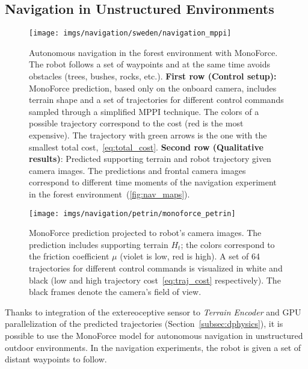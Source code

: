 \subsection{Navigation in Unstructured Environments}\label{subsec:navigation}
\begin{figure*}
    \centering
    \texttt{[image: imgs/navigation/sweden/navigation\_mppi]}
    \caption{Autonomous navigation in the forest environment with MonoForce.
    The robot follows a set of waypoints and at the same time avoids obstacles (trees, bushes, rocks, etc.).
    \textbf{First row (Control setup):}
    MonoForce prediction, based only on the onboard camera, includes terrain shape and a set of trajectories for different control commands sampled through a simplified MPPI technique.
    The colors of a possible trajectory correspond to the cost (red is the most expensive).
    The trajectory with green arrows is the one with the smallest total cost,~\eqref{eq:total_cost}.
    \textbf{Second row (Qualitative results)}: Predicted supporting terrain and robot trajectory given camera images.
    The predictions and frontal camera images correspond to different time moments of the navigation experiment in the forest environment~(\autoref{fig:nav_maps}).
    }
    \label{fig:nav_monoforce}
\end{figure*}
\begin{figure}
    \centering
    \texttt{[image: imgs/navigation/petrin/monoforce\_petrin]}
    \caption{MonoForce prediction projected to robot's camera images.
    The prediction includes supporting terrain $H_t$;
    the colors correspond to the friction coefficient $\mu$ (violet is low, red is high).
    A set of 64 trajectories for different control commands is visualized in white and black (low and high trajectory cost~\eqref{eq:traj_cost} respectively).
    The black frames denote the camera's field of view.}
    \label{fig:nav_petrin}
\end{figure}
Thanks to integration of the extereoceptive sensor to \emph{Terrain Encoder} and GPU parallelization of the predicted trajectories (Section~\ref{subsec:dphysics}),
it is possible to use the MonoForce model for autonomous navigation in unstructured outdoor environments.
In the navigation experiments, the robot is given a set of distant waypoints to follow.
